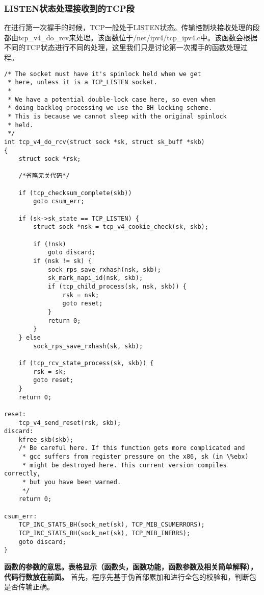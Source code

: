 \documentclass[11pt, a4paper,oneside]{book}
\theoremstyle{ocrenumbox}
\theoremstyle{purplenumbox}
\theoremstyle{blackbox}
\begin{document}
            \subsubsection{LISTEN状态处理接收到的TCP段}
                在进行第一次握手的时候，TCP一般处于LISTEN状态。传输控制块接收处理的段都由tcp\_v4\_do\_rcv来处理。该函数位于/net/ipv4/tcp\_ipv4.c中。该函数会根据不同的TCP状态进行不同的处理，这里我们只是讨论第一次握手的函数处理过程。
\begin{verbatim}
/* The socket must have it's spinlock held when we get
 * here, unless it is a TCP_LISTEN socket.
 *
 * We have a potential double-lock case here, so even when
 * doing backlog processing we use the BH locking scheme.
 * This is because we cannot sleep with the original spinlock
 * held.
 */
int tcp_v4_do_rcv(struct sock *sk, struct sk_buff *skb)
{
    struct sock *rsk;

    /*省略无关代码*/

    if (tcp_checksum_complete(skb))
        goto csum_err;

    if (sk->sk_state == TCP_LISTEN) {
        struct sock *nsk = tcp_v4_cookie_check(sk, skb);

        if (!nsk)
            goto discard;
        if (nsk != sk) {
            sock_rps_save_rxhash(nsk, skb);
            sk_mark_napi_id(nsk, skb);
            if (tcp_child_process(sk, nsk, skb)) {
                rsk = nsk;
                goto reset;
            }
            return 0;
        }
    } else
        sock_rps_save_rxhash(sk, skb);

    if (tcp_rcv_state_process(sk, skb)) {
        rsk = sk;
        goto reset;
    }
    return 0;

reset:
    tcp_v4_send_reset(rsk, skb);
discard:
    kfree_skb(skb);
    /* Be careful here. If this function gets more complicated and
     * gcc suffers from register pressure on the x86, sk (in \%ebx)
     * might be destroyed here. This current version compiles correctly,
     * but you have been warned.
     */
    return 0;

csum_err:
    TCP_INC_STATS_BH(sock_net(sk), TCP_MIB_CSUMERRORS);
    TCP_INC_STATS_BH(sock_net(sk), TCP_MIB_INERRS);
    goto discard;
}
\end{verbatim}

                \textbf{函数的参数的意思。表格显示（函数头，函数功能，函数参数及相关简单解释），代码行数放在前面。}
                首先，程序先基于伪首部累加和进行全包的校验和，判断包是否传输正确。
\end{document}
